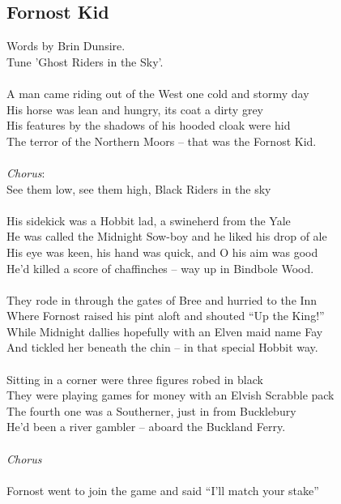 \begin{multicols}{2}
\section{Fornost Kid}
Words by Brin Dunsire.
\\
Tune ’Ghost Riders in the Sky’.
\\
\\
A man came riding out of the West one cold and stormy day
\\
His horse was lean and hungry, its coat a dirty grey
\\
His features by the shadows of his hooded cloak were hid
\\
The terror of the Northern Moors – that was the Fornost Kid.
\\
\\
\textit{Chorus}:
\\
See them low, see them high, Black Riders in the sky
\\
\\
His sidekick was a Hobbit lad, a swineherd from the Yale
\\
He was called the Midnight Sow-boy and he liked his drop of ale
\\
His eye was keen, his hand was quick, and O his aim was good
\\
He’d killed a score of chaffinches – way up in Bindbole Wood.
\\
\\
They rode in through the gates of Bree and hurried to the Inn
\\
Where Fornost raised his pint aloft and shouted “Up the King!”
\\
While Midnight dallies hopefully with an Elven maid name Fay
\\
And tickled her beneath the chin – in that special Hobbit way.
\\
\\
Sitting in a corner were three figures robed in black
\\
They were playing games for money with an Elvish Scrabble pack
\\
The fourth one was a Southerner, just in from Bucklebury
\\
He’d been a river gambler – aboard the Buckland Ferry.
\\
\\
\textit{Chorus}
\\
\\
Fornost went to join the game and said “I’ll match your stake”

\end{multicols}
